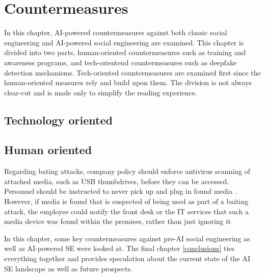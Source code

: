 



\chapter{Countermeasures\label{countermeasures}}
\begin{comment}


\end{comment}


In this chapter, AI-powered countermeasures against both classic social engineering and AI-powered social engineering are examined. This chapter is divided into two parts, human-oriented countermeasures such as training and awareness programs, and tech-orientend countermeasures such as deepfake detection mechanisms. Tech-oriented countermeasures are examined first since the human-oriented measures rely and build upon them. The division is not always clear-cut and is made only to simplify the reading experience.


\section{Technology oriented}
\begin{comment}
    
    - 

\end{comment}



\section{Human oriented}
\begin{comment}
    
    - 

\end{comment}


Regarding bating attacks, company policy should enforce antivirus scanning of attached media, such as USB thumbdrives, before they can be accessed. Personnel should be instructed to never pick up and plug in found media \citep{salahdine_social_2019}. However, if media is found that is suspected of being used as part of a baiting attack, the employee could notify the front desk or the IT services that such a media device was found within the premises, rather than just ignoring it 



In this chapter, some key countermeasures against pre-AI social engineering as well as AI-powered SE were looked at. The final chapter \ref{conclusions} ties everything together and provides speculation about the current state of the AI SE landscape as well as future prospects.


